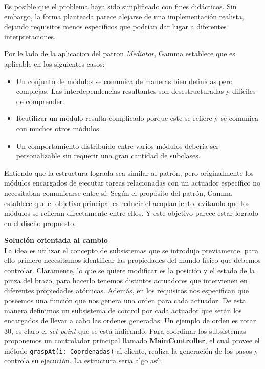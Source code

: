 Es posible que el problema haya sido simplificado con fines didácticos. Sin embargo, la forma planteada parece alejarse de una implementación realista, dejando requisitos menos específicos que podrían dar lugar a diferentes interpretaciones.

Por le lado de la aplicacion del patron \textit{Mediator}, Gamma establece que es aplicable en los siguientes casos:
\begin{itemize}
\item Un conjunto de módulos se comunica de maneras bien definidas pero complejas. Las interdependencias resultantes son desestructuradas y difíciles de comprender.

\item Reutilizar un módulo resulta complicado porque este se refiere y se comunica con muchos otros módulos.

\item Un comportamiento distribuido entre varios módulos debería ser personalizable sin requerir una gran cantidad de subclases.
\end{itemize}

Entiendo que la estructura lograda sea similar al patrón, pero originalmente los módulos encargados de ejecutar tareas relacionadas con un actuador específico no necesitaban comunicarse entre sí. Según el propósito del patrón, Gamma establece que el objetivo principal es reducir el acoplamiento, evitando que los módulos se refieran directamente entre ellos. Y este objetivo parece estar logrado en el diseño propuesto.

\noident
\textbf{Solución orientada al cambio}
\\
\noident
La idea es utilizar el concepto de subsistemas que se introdujo previamente, para ello primero necesitamos identificar las propiedades del mundo físico que debemos controlar. Claramente, lo que se quiere modificar es la posición y el estado de la pinza del brazo, para hacerlo tenemos distintos actuadores que intervienen en diferentes propiedades atómicas. Además, en los requisitos nos especifican que poseemos una función que nos genera una orden para cada actuador. De esta manera definimos un subsistema de control por cada actuador que serán los encargados de llevar a cabo las ordenes generadas. Un ejemplo de orden es rotar 30\textdegree, es claro el \textit{set-point} que se está indicando. Para coordinar los subsistemas proponemos un controlador principal llamado \textbf{MainController}, el cual provee el método \verb|graspAt(i: Coordenadas)| al cliente, realiza la generación de los pasos y controla su ejecución. La estructura seria algo así:


